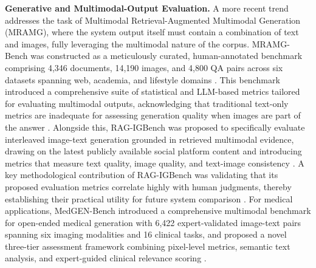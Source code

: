 \documentclass[11pt]{article}
\begin{document}
\textbf{Generative and Multimodal-Output Evaluation.} A more recent trend addresses the task of Multimodal Retrieval-Augmented Multimodal Generation (MRAMG), where the system output itself must contain a combination of text and images, fully leveraging the multimodal nature of the corpus. MRAMG-Bench was constructed as a meticulously curated, human-annotated benchmark comprising 4,346 documents, 14,190 images, and 4,800 QA pairs across six datasets spanning web, academia, and lifestyle domains \cite{ref361}. This benchmark introduced a comprehensive suite of statistical and LLM-based metrics tailored for evaluating multimodal outputs, acknowledging that traditional text-only metrics are inadequate for assessing generation quality when images are part of the answer \cite{ref361}. Alongside this, RAG-IGBench was proposed to specifically evaluate interleaved image-text generation grounded in retrieved multimodal evidence, drawing on the latest publicly available social platform content and introducing metrics that measure text quality, image quality, and text-image consistency \cite{ref362}. A key methodological contribution of RAG-IGBench was validating that its proposed evaluation metrics correlate highly with human judgments, thereby establishing their practical utility for future system comparison \cite{ref362}. For medical applications, MedGEN-Bench introduced a comprehensive multimodal benchmark for open-ended medical generation with 6,422 expert-validated image-text pairs spanning six imaging modalities and 16 clinical tasks, and proposed a novel three-tier assessment framework combining pixel-level metrics, semantic text analysis, and expert-guided clinical relevance scoring \cite{ref363}.
\end{document}
